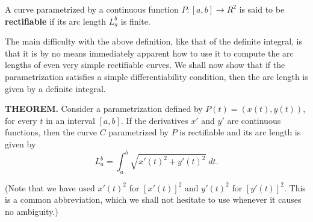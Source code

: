A curve parametrized by a continuous function $P:[a, b] \rightarrow R^2$ is said to be \textbf{rectifiable} if its arc length $L_a^b$ is finite.

The main difficulty with the above definition, like that of the definite integral, is that it is by no means immediately apparent how to use it to compute the arc lengths of even very simple rectifiable curves. We shall now show that if the parametrization satisfies a simple differentiability condition, then the arc length is given by a definite integral.
\begin{theorem} \textbf{THEOREM.} Consider a parametrization defined by $P(t) = (x(t), y(t))$, for every $t$ in an interval $[a, b]$. If the derivatives $x'$ and $y'$ are continuous functions, then the curve $C$ parametrized by $P$ is rectifiable and its arc length is given by 
$$
L_a^b = \int_a^b \sqrt{x'(t)^2 + y'(t)^2} \;dt .
$$

(Note that we have used $x'(t)^2$ for $[x'(t)]^2$ and $y'(t)^2$ for $[y'(t)]^2$. This is a common abbreviation, which we shall not hesitate to use whenever it causes no ambiguity.)
\end{theorem}

